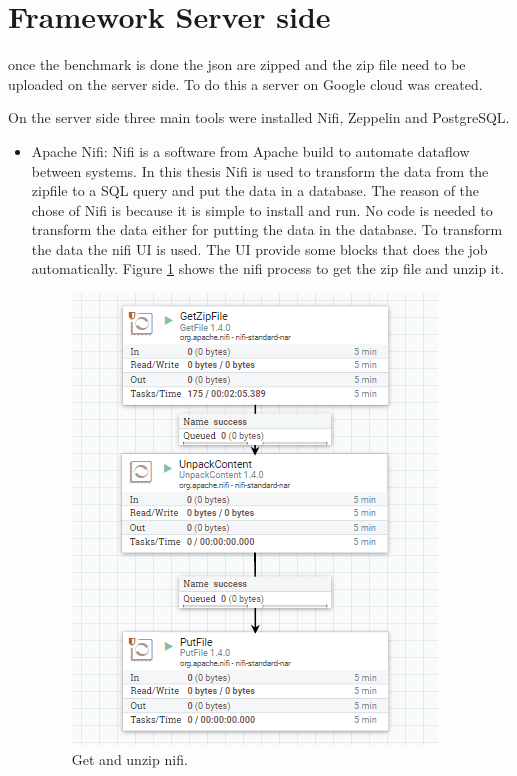 \documentclass[english]{book_template} %
\begin{document}
\section{Framework Server side}

once the benchmark is done the json are zipped and the zip file need to be uploaded on the server side. To do this a server on Google cloud was created. 

On the server side three main tools were installed Nifi, Zeppelin and PostgreSQL. 
\begin{itemize}
\item Apache Nifi: Nifi is a software from Apache build to automate dataflow between systems. In this thesis Nifi is used to transform the data from the zipfile to a SQL query and put the data in a database. The reason of the chose of Nifi is because it is simple to install and run. No code is needed to transform the data either for putting the data in the database. To transform the data the nifi UI is used. The UI provide some blocks that does the job automatically.    %
Figure \ref{fig:zipNifi} shows the nifi process to get the zip file and unzip it.
 
\begin{figure}[H]
\center
\caption{Get and unzip nifi.\label{fig:zipNifi}}
\includegraphics[scale=1]{./img/getzip}
\end{figure} 


\end{itemize}
\end{document}
